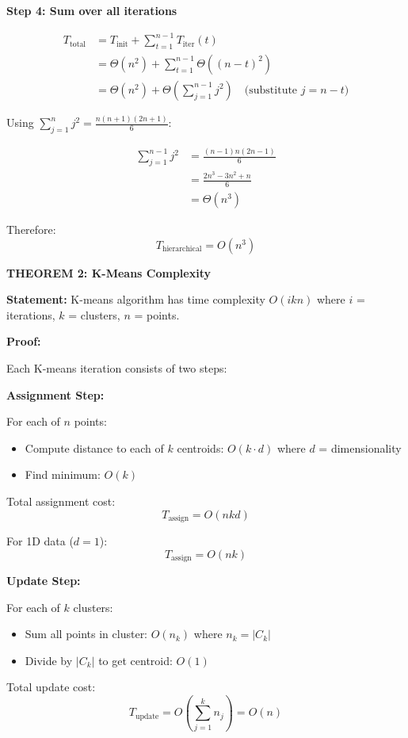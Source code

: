 \documentclass[12pt]{article}
\begin{document}
\begin{solution}
\textbf{Step 4: Sum over all iterations}

\begin{align*}
T_{\text{total}} &= T_{\text{init}} + \sum_{t=1}^{n-1} T_{\text{iter}}(t) \\
&= \Theta(n^2) + \sum_{t=1}^{n-1} \Theta((n-t)^2) \\
&= \Theta(n^2) + \Theta\left(\sum_{j=1}^{n-1} j^2\right) \quad \text{(substitute } j = n-t\text{)}
\end{align*}

Using $\sum_{j=1}^{n} j^2 = \frac{n(n+1)(2n+1)}{6}$:

\begin{align*}
\sum_{j=1}^{n-1} j^2 &= \frac{(n-1)n(2n-1)}{6} \\
&= \frac{2n^3 - 3n^2 + n}{6} \\
&= \Theta(n^3)
\end{align*}

Therefore:
\[
\boxed{T_{\text{hierarchical}} = O(n^3)}
\]

\textbf{THEOREM 2: K-Means Complexity}

\textbf{Statement:} K-means algorithm has time complexity $O(ikn)$ where $i$ = iterations, $k$ = clusters, $n$ = points.

\textbf{Proof:}

Each K-means iteration consists of two steps:

\textbf{Assignment Step:}

For each of $n$ points:
\begin{itemize}
\item Compute distance to each of $k$ centroids: $O(k \cdot d)$ where $d$ = dimensionality
\item Find minimum: $O(k)$
\end{itemize}

Total assignment cost:
\[
T_{\text{assign}} = O(nkd)
\]

For 1D data ($d=1$):
\[
T_{\text{assign}} = O(nk)
\]

\textbf{Update Step:}

For each of $k$ clusters:
\begin{itemize}
\item Sum all points in cluster: $O(n_k)$ where $n_k = |C_k|$
\item Divide by $|C_k|$ to get centroid: $O(1)$
\end{itemize}

Total update cost:
\[
T_{\text{update}} = O\left(\sum_{j=1}^k n_j\right) = O(n)
\]


\end{solution}
\end{document}
